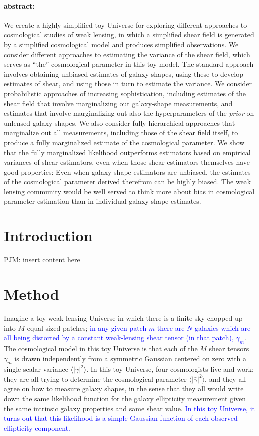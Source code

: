 \documentclass[12pt]{article}
\def\shearvar{\langle |\bar{\gamma}|^2\rangle}
\def\phil#1{\textcolor{blue}{#1}}
\begin{document}
\paragraph{abstract:}
We create a highly simplified toy Universe for exploring different
approaches to cosmological studies of weak lensing, in which a
simplified shear field is generated by a simplified cosmological model
and produces simplified observations.  We consider different
approaches to estimating the variance of the shear field, which serves
as ``the'' cosmological parameter in this toy model.  The standard
approach involves obtaining unbiased estimates of galaxy shapes, using
these to develop estimates of shear, and using those in turn to
estimate the variance.  We consider probabilistic approaches of
increasing sophistication, including estimates of the shear field that
involve marginalizing out galaxy-shape measurements, and estimates
that involve marginalizing out also the hyperparameters of the
\emph{prior} on unlensed galaxy shapes.  We also consider fully
hierarchical approaches that marginalize out all measurements,
including those of the shear field itself, to produce a fully
marginalized estimate of the cosmological parameter.  We show that the
fully marginalized likelihood outperforms estimators based on
empirical variances of shear estimators, even when those shear
estimators themselves have good properties: Even when galaxy-shape
estimators are unbiased, the estimates of the cosmological parameter
derived therefrom can be highly biased.  The weak lensing community
would be well served to think more about bias in cosmological
parameter estimation than in individual-galaxy shape estimates.

\section{Introduction}

PJM: insert content here

\section{Method}

Imagine a toy weak-lensing Universe in which there is a finite sky chopped up
into $M$ equal-sized patches; \phil{in any given patch $m$ there are $N$
galaxies which are all being  distorted by a constant weak-lensing shear
tensor (in that patch), $\gamma_m$}.  The cosmological model in this toy
Universe is that each of the $M$ shear tensors $\gamma_m$ is drawn
independently from a symmetric Gaussian centered on zero with a single scalar
variance $\shearvar$.  In this toy Universe, four cosmologists live and work;
they are all trying to determine the cosmological parameter $\shearvar$, and
they all agree on how to measure galaxy shapes, in the sense that they all
would write down the same likelihood function for the galaxy ellipticity
measurement given the same intrinsic galaxy properties and same shear value.
\phil{In this toy Universe, it turns out that this likelihood is a simple
Gaussian function of each observed ellipticity component.}
\end{document}
